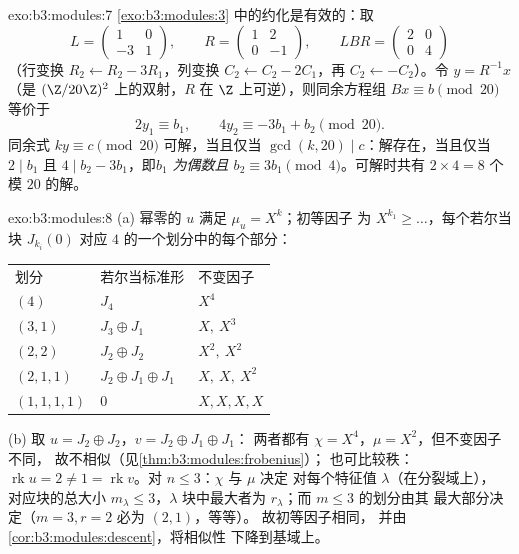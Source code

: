 \begin{solution}{exo:b3:modules:7}
\cref{exo:b3:modules:3} 中的约化是有效的：取
\[
L = \begin{pmatrix} 1 & 0\\ -3 & 1\end{pmatrix},
\qquad
R = \begin{pmatrix} 1 & 2\\ 0 & -1 \end{pmatrix},
\qquad
LBR = \begin{pmatrix} 2 & 0\\ 0 & 4\end{pmatrix}
\]
（行变换 $R_2 \leftarrow R_2 - 3R_1$，列变换
$C_2 \leftarrow C_2 - 2C_1$，再 $C_2 \leftarrow -C_2$）。令
$y = R^{-1}x$（是 $(\Z/20\Z)^2$ 上的双射，$R$
在 $\Z$ 上可逆），则同余方程组 $Bx \equiv b \pmod{20}$
等价于
\[
2y_1 \equiv b_1, \qquad 4y_2 \equiv -3b_1 + b_2 \pmod{20}.
\]
同余式 $ky \equiv c \pmod{20}$ 可解，当且仅当
$\gcd(k, 20) \mid c$：解存在，当且仅当 $2 \mid b_1$ 且 $4
\mid b_2 - 3b_1$，即\emph{$b_1$ 为偶数且 $b_2 \equiv 3b_1
\pmod 4$}。可解时共有 $2 \times 4 = 8$ 个
模 $20$ 的解。
\end{solution}

\begin{solution}{exo:b3:modules:8}
(a) 幂零的 $u$ 满足 $\mu_u = X^k$；初等因子
为 $X^{k_1} \geq \dots$，每个若尔当块 $J_{k_i}(0)$ 对应
$4$ 的一个划分中的每个部分：
\begin{center}
\begin{tabular}{l l l}
划分 & 若尔当标准形 & 不变因子\\
$(4)$ & $J_4$ & $X^4$\\
$(3,1)$ & $J_3 \oplus J_1$ & $X,\ X^3$\\
$(2,2)$ & $J_2 \oplus J_2$ & $X^2,\ X^2$\\
$(2,1,1)$ & $J_2 \oplus J_1 \oplus J_1$ & $X,\ X,\ X^2$\\
$(1,1,1,1)$ & $0$ & $X, X, X, X$
\end{tabular}
\end{center}
(b) 取 $u = J_2\oplus J_2$，$v = J_2 \oplus J_1 \oplus J_1$：
两者都有 $\chi = X^4$，$\mu = X^2$，但不变因子不同，
故不相似（见\cref{thm:b3:modules:frobenius}）；
也可比较秩：$\operatorname{rk} u = 2 \neq 1 =
\operatorname{rk} v$。对 $n \leq 3$：$\chi$ 与 $\mu$ 决定
对每个特征值 $\lambda$（在分裂域上），
对应块的总大小 $m_\lambda \leq 3$，$\lambda$ 块中最大者为
$r_\lambda$；而 $m \leq 3$ 的划分由其
最大部分决定（$m = 3, r = 2$ 必为 $(2,1)$，等等）。
故初等因子相同，
并由\cref{cor:b3:modules:descent}，将相似性
下降到基域上。
\end{solution}

